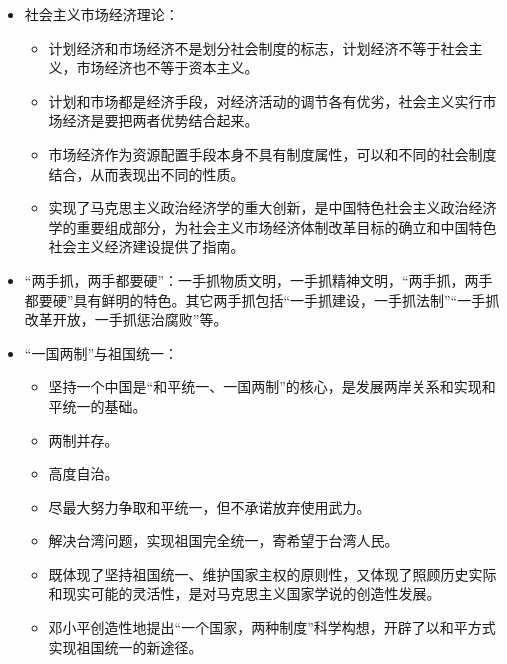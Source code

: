 \documentclass{article}
\begin{document}
\begin{itemize}
\begin{itemize}
        \item 改革是一项崭新的事业，是一个大试验。
        \item 开放也是改革，对外开放是建设中国特色社会主义的一项基本国策，和改革一起成为新时期最鲜明的特征。
        \item 实行对外开放是对中国经济发展停滞落后历史教训深刻总结的结果。
        \item 对外开放是对世界所有国家的开放，包括对发达国家的开放，也包括对发展中国家的开放；不仅是经济领域的开放，还包括科技、教育、文化等领域的开放。
    \end{itemize}
    \item 社会主义市场经济理论：
    \begin{itemize}
        \item 计划经济和市场经济不是划分社会制度的标志，计划经济不等于社会主义，市场经济也不等于资本主义。
        \item 计划和市场都是经济手段，对经济活动的调节各有优劣，社会主义实行市场经济是要把两者优势结合起来。
        \item 市场经济作为资源配置手段本身不具有制度属性，可以和不同的社会制度结合，从而表现出不同的性质。
        \item 实现了马克思主义政治经济学的重大创新，是中国特色社会主义政治经济学的重要组成部分，为社会主义市场经济体制改革目标的确立和中国特色社会主义经济建设提供了指南。
    \end{itemize}
    \item “两手抓，两手都要硬”：一手抓物质文明，一手抓精神文明，“两手抓，两手都要硬”具有鲜明的特色。其它两手抓包括“一手抓建设，一手抓法制”“一手抓改革开放，一手抓惩治腐败”等。
    \item “一国两制”与祖国统一：
    \begin{itemize}
        \item 坚持一个中国是“和平统一、一国两制”的核心，是发展两岸关系和实现和平统一的基础。
        \item 两制并存。
        \item 高度自治。
        \item 尽最大努力争取和平统一，但不承诺放弃使用武力。
        \item 解决台湾问题，实现祖国完全统一，寄希望于台湾人民。
        \item 既体现了坚持祖国统一、维护国家主权的原则性，又体现了照顾历史实际和现实可能的灵活性，是对马克思主义国家学说的创造性发展。
        \item 邓小平创造性地提出“一个国家，两种制度”科学构想，开辟了以和平方式实现祖国统一的新途径。
    \end{itemize}

\end{itemize}
\end{document}
